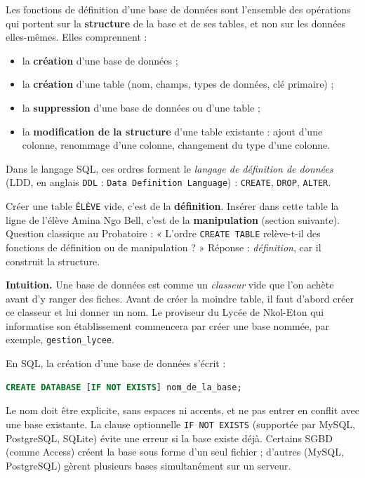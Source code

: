 \documentclass[11pt]{article}
\newcommand{\cle}[1]{{\popxbold\color{popdark}#1}}
\newcounter{popsec}
\newcounter{popsub}
\newcommand{\courssub}[1]{%
  \stepcounter{popsub}%
  \par\vspace{9pt}\noindent{\popxbold\fontsize{11.5}{13}\selectfont\color{popink}{\color{poporange}\thepopsec.\thepopsub}\hspace{6pt}#1}\par\nopagebreak\vspace{4pt}
}
\begin{document}
\begin{definition}
Les \cle{fonctions de définition} d'une base de données sont l'ensemble des opérations qui portent sur la \textbf{structure} de la base et de ses tables, et non sur les données elles-mêmes. Elles comprennent :
\begin{itemize}
\item la \textbf{création} d'une base de données ;
\item la \textbf{création} d'une table (nom, champs, types de données, clé primaire) ;
\item la \textbf{suppression} d'une base de données ou d'une table ;
\item la \textbf{modification de la structure} d'une table existante : ajout d'une colonne, renommage d'une colonne, changement du type d'une colonne.
\end{itemize}
Dans le langage SQL, ces ordres forment le \emph{langage de définition de données} (LDD, en anglais \texttt{DDL} : \texttt{Data Definition Language}) : \texttt{CREATE}, \texttt{DROP}, \texttt{ALTER}.
\end{definition}

\begin{attention}
Créer une table \texttt{ÉLÈVE} vide, c'est de la \textbf{définition}. Insérer dans cette table la ligne de l'élève Amina Ngo Bell, c'est de la \textbf{manipulation} (section suivante). Question classique au Probatoire : « L'ordre \texttt{CREATE TABLE} relève-t-il des fonctions de définition ou de manipulation ? » Réponse : \emph{définition}, car il construit la structure.
\end{attention}

\courssub{Création d'une base de données}

\textbf{Intuition.} Une base de données est comme un \emph{classeur} vide que l'on achète avant d'y ranger des fiches. Avant de créer la moindre table, il faut d'abord créer ce classeur et lui donner un nom. Le proviseur du Lycée de Nkol-Eton qui informatise son établissement commencera par créer une base nommée, par exemple, \texttt{gestion\_lycee}.

\begin{propriete}
En SQL, la création d'une base de données s'écrit :
\begin{lstlisting}[language=SQL]
CREATE DATABASE [IF NOT EXISTS] nom_de_la_base;
\end{lstlisting}
Le nom doit être explicite, sans espaces ni accents, et ne pas entrer en conflit avec une base existante. La clause optionnelle \texttt{IF NOT EXISTS} (supportée par MySQL, PostgreSQL, SQLite) évite une erreur si la base existe déjà. Certains SGBD (comme Access) créent la base sous forme d'un seul fichier ; d'autres (MySQL, PostgreSQL) gèrent plusieurs bases simultanément sur un serveur.
\end{propriete}
\end{document}
